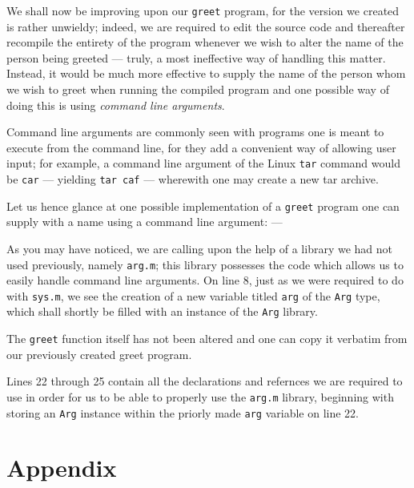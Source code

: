 \documentclass[a5paper,twoside,12pt]{report}
\begin{document}
We shall now be improving upon our \texttt{greet} program, for the version we created is rather unwieldy; indeed, we are required to edit the source code and thereafter recompile the entirety of the program whenever we wish to alter the name of the person being greeted — truly, a most ineffective way of handling this matter. Instead, it would be much more effective to supply the name of the person whom we wish to greet when running the compiled program and one possible way of doing this is using \textit{command line arguments}.

Command line arguments are commonly seen with programs one is meant to execute from the command line, for they add a convenient way of allowing user input; for example, a command line argument of the Linux \texttt{tar} command would be \texttt{car} — yielding \texttt{tar caf} — wherewith one may create a new tar archive.

Let us hence glance at one possible implementation of a \texttt{greet} program one can supply with a name using a command line argument: —



As you may have noticed, we are calling upon the help of a library we had not used previously, namely \texttt{arg.m}; this library possesses the code which allows us to easily handle command line arguments. On line 8, just as we were required to do with \texttt{sys.m}, we see the creation of a new variable titled \texttt{arg} of the \texttt{Arg} type, which shall shortly be filled with an instance of the \texttt{Arg} library.

The \texttt{greet} function itself has not been altered and one can copy it verbatim from our previously created greet program.

Lines 22 through 25 contain all the declarations and refernces we are required to use in order for us to be able to properly use the \texttt{arg.m} library, beginning with storing an \texttt{Arg} instance within the priorly made \texttt{arg} variable on line 22.

\newpage
\thispagestyle{empty}
  \mbox{}

\part*{Appendix}
  \newpage

\thispagestyle{empty}
  \mbox{}
  \newpage
\end{document}
